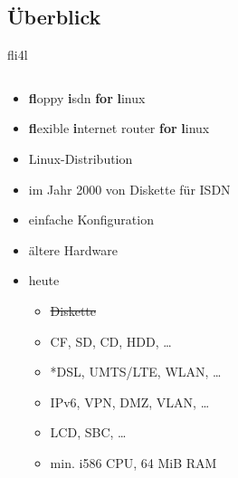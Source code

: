 \documentclass[t]{beamer}
\makeatletter
\newcommand{\soutthick}[1]{%
    \renewcommand{\ULthickness}{1pt}%
        \sout{#1}%
    \renewcommand{\ULthickness}{.4pt}%
}
\newcommand{\strong}[1]{\@strong{#1}}
\newcommand{\@@strong}[1]{\textbf{\let\@strong\@@@strong#1}}
\newcommand{\@@@strong}[1]{\textnormal{\let\@strong\@@strong#1}}
\let\@strong\@@strong
\makeatother
\begin{document}
\subsection{Überblick}

\begin{frame}{fli4l}
    \begin{columns}[T,onlytextwidth]
        \begin{column}{0.6\textwidth}
            \begin{itemize}
                \item \strong{fl}oppy \strong{i}sdn \strong{for} \strong{l}inux
                \item \strong{fl}exible \strong{i}nternet router \strong{for}
                    \strong {l}inux
                \item<2-> Linux-Distribution
                \item<2-> im Jahr 2000 von Diskette für ISDN
                \item<2-> einfache Konfiguration
                \item<2-> ältere Hardware
                \item<3-> heute
                    \begin{itemize}
                        \item \soutthick{Diskette}
                        \item CF, SD, CD, HDD, …
                        \item *DSL, UMTS/LTE, WLAN, …
                        \item IPv6, VPN, DMZ, VLAN, …
                        \item LCD, SBC, …
                        \item min. i586 CPU, 64 MiB RAM
                    \end{itemize}
            \end{itemize}
        \end{column}
        \begin{column}{0.37\textwidth}
            \begin{figure}
                
            \end{figure}
        \end{column}
    \end{columns}
\end{frame}
\end{document}

